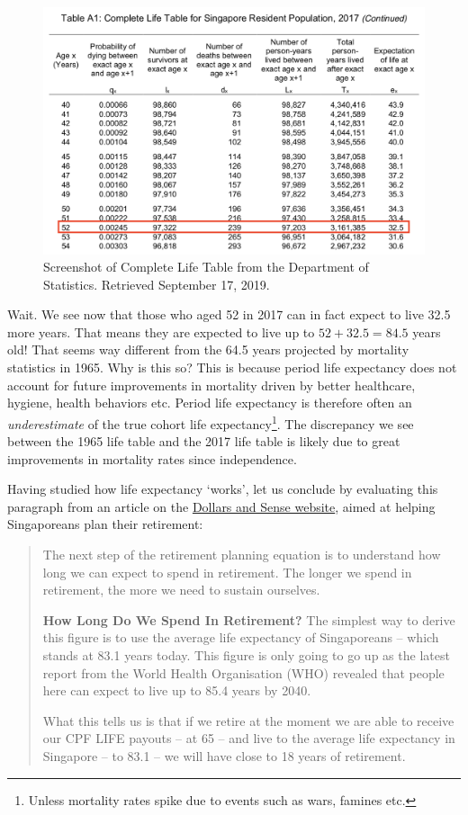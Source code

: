 \documentclass[openany]{book}
\let\rmarkdownfootnote\footnote%
\def\footnote{\protect\rmarkdownfootnote}
\begin{document}
\begin{figure}

{\centering \includegraphics[width=0.8\linewidth]{images/apc/apc_lifetable2} 

}

\caption{Screenshot of Complete Life Table from the Department of Statistics. Retrieved September 17, 2019.}\label{fig:apc-lifetabletwo}
\end{figure}

Wait. We see now that those who aged 52 in 2017 can in fact expect to
live 32.5 more years. That means they are expected to live up to
\(52 + 32.5 = 84.5\) years old! That seems way different from the 64.5
years projected by mortality statistics in 1965. Why is this so? This is
because period life expectancy does not account for future improvements
in mortality driven by better healthcare, hygiene, health behaviors etc.
Period life expectancy is therefore often an \emph{underestimate} of the
true cohort life expectancy\footnote{Unless mortality rates spike due to
  events such as wars, famines etc.}. The discrepancy we see between the
1965 life table and the 2017 life table is likely due to great
improvements in mortality rates since independence.

Having studied how life expectancy `works', let us conclude by
evaluating this paragraph from an article on the
\href{https://dollarsandsense.sg/retirement-planning-singapore-live-beyond-average-life-expectancy/}{Dollars
and Sense website}, aimed at helping Singaporeans plan their retirement:

\begin{quote}
The next step of the retirement planning equation is to understand how
long we can expect to spend in retirement. The longer we spend in
retirement, the more we need to sustain ourselves.

\textbf{How Long Do We Spend In Retirement?} The simplest way to derive
this figure is to use the average life expectancy of Singaporeans --
which stands at 83.1 years today. This figure is only going to go up as
the latest report from the World Health Organisation (WHO) revealed that
people here can expect to live up to 85.4 years by 2040.

What this tells us is that if we retire at the moment we are able to
receive our CPF LIFE payouts -- at 65 -- and live to the average life
expectancy in Singapore -- to 83.1 -- we will have close to 18 years of
retirement.
\end{quote}
\end{document}
